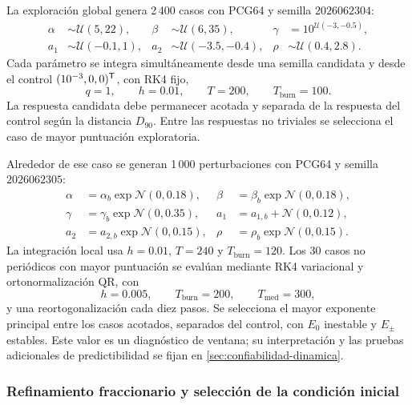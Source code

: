 La exploración global genera 2\,400 casos con PCG64 y semilla
\(2026062304\):
\begin{equation}
\begin{aligned}
\alpha&\sim\mathcal U(5,22),&
\beta&\sim\mathcal U(6,35),&
\gamma&=10^{\mathcal U(-3,-0.5)},\\
a_1&\sim\mathcal U(-0.1,1),&
a_2&\sim\mathcal U(-3.5,-0.4),&
\rho&\sim\mathcal U(0.4,2.8).
\end{aligned}
\label{eq:distribucion_global_c590}
\end{equation}
Cada parámetro se integra simultáneamente desde una semilla candidata y desde
el control \((10^{-3},0,0)^{\mathsf T}\), con RK4 fijo,
\[
q=1,\qquad h=0.01,\qquad T=200,\qquad T_{\mathrm{burn}}=100.
\]
La respuesta candidata debe permanecer acotada y separada de la respuesta del
control según la distancia \(D_{90}\). Entre las respuestas no triviales se
selecciona el caso de mayor puntuación exploratoria.

Alrededor de ese caso se generan 1\,000 perturbaciones con PCG64 y semilla
\(2026062305\):
\begin{equation}
\begin{aligned}
\alpha&=\alpha_b\exp\mathcal N(0,0.18),&
\beta&=\beta_b\exp\mathcal N(0,0.18),\\
\gamma&=\gamma_b\exp\mathcal N(0,0.35),&
a_1&=a_{1,b}+\mathcal N(0,0.12),\\
a_2&=a_{2,b}\exp\mathcal N(0,0.15),&
\rho&=\rho_b\exp\mathcal N(0,0.15).
\end{aligned}
\label{eq:perturbacion_local_c590}
\end{equation}
La integración local usa \(h=0.01\), \(T=240\) y
\(T_{\mathrm{burn}}=120\). Los 30 casos no periódicos con mayor puntuación se
evalúan mediante RK4 variacional y ortonormalización QR, con
\[
h=0.005,\qquad T_{\mathrm{burn}}=200,\qquad
T_{\mathrm{med}}=300,
\]
y una reortogonalización cada diez pasos. Se selecciona el mayor exponente
principal entre los casos acotados, separados del control, con \(E_0\)
inestable y \(E_\pm\) estables. Este valor es un diagnóstico de ventana; su
interpretación y las pruebas adicionales de predictibilidad se fijan en
\cref{sec:confiabilidad-dinamica}.

\subsubsection{Refinamiento fraccionario y selección de la condición inicial}

